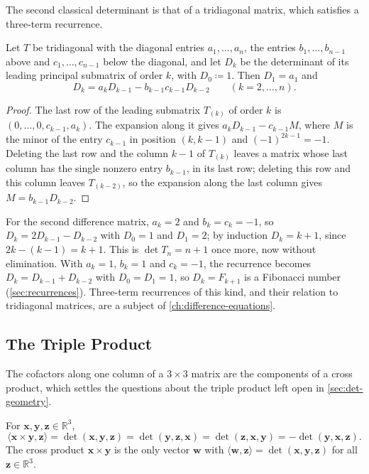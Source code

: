 The second classical determinant is that of a tridiagonal matrix, which satisfies a three-term recurrence.

\begin{proposition}
\label{prop:tridiagonal-det}
Let $T$ be tridiagonal with the diagonal entries $a_1,\ldots,a_n$, the entries $b_1,\ldots,b_{n-1}$ above and $c_1,\ldots,c_{n-1}$ below the diagonal, and let $D_k$ be the determinant of its leading principal submatrix of order $k$, with $D_0\coloneqq1$. Then $D_1=a_1$ and
\[
D_k=a_kD_{k-1}-b_{k-1}c_{k-1}D_{k-2}\qquad(k=2,\ldots,n).
\]
\end{proposition}

\begin{proof}
The last row of the leading submatrix $T_{(k)}$ of order $k$ is $(0,\ldots,0,c_{k-1},a_k)$. The expansion along it gives $a_kD_{k-1}-c_{k-1}M$, where $M$ is the minor of the entry $c_{k-1}$ in position $(k,k-1)$ and $(-1)^{2k-1}=-1$. Deleting the last row and the column $k-1$ of $T_{(k)}$ leaves a matrix whose last column has the single nonzero entry $b_{k-1}$, in its last row; deleting this row and this column leaves $T_{(k-2)}$, so the expansion along the last column gives $M=b_{k-1}D_{k-2}$.
\end{proof}

For the second difference matrix, $a_k=2$ and $b_k=c_k=-1$, so $D_k=2D_{k-1}-D_{k-2}$ with $D_0=1$ and $D_1=2$; by induction $D_k=k+1$, since $2k-(k-1)=k+1$. This is $\det T_n=n+1$ once more, now without elimination. With $a_k=1$, $b_k=1$ and $c_k=-1$, the recurrence becomes $D_k=D_{k-1}+D_{k-2}$ with $D_0=D_1=1$, so $D_k=F_{k+1}$ is a Fibonacci number (\cref{sec:recurrences}). Three-term recurrences of this kind, and their relation to tridiagonal matrices, are a subject of \cref{ch:difference-equations}.

\subsection{The Triple Product}

The cofactors along one column of a $3\times3$ matrix are the components of a cross product, which settles the questions about the triple product left open in \cref{sec:det-geometry}.

\begin{proposition}
\label{prop:triple-product}
For $\mathbf x,\mathbf y,\mathbf z\in\mathbb R^3$,
\[
\langle\mathbf x\times\mathbf y,\mathbf z\rangle=\det(\mathbf x,\mathbf y,\mathbf z)=\det(\mathbf y,\mathbf z,\mathbf x)=\det(\mathbf z,\mathbf x,\mathbf y)=-\det(\mathbf y,\mathbf x,\mathbf z).
\]
The cross product $\mathbf x\times\mathbf y$ is the only vector $\mathbf w$ with $\langle\mathbf w,\mathbf z\rangle=\det(\mathbf x,\mathbf y,\mathbf z)$ for all $\mathbf z\in\mathbb R^3$.
\end{proposition}

